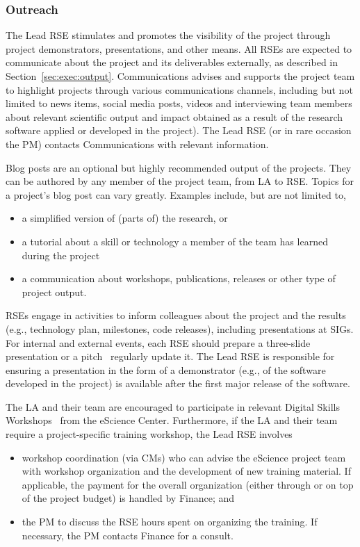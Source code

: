 \subsubsection{Outreach}
\label{sec:exec:outreach}
The Lead RSE stimulates and promotes the visibility of the project through project demonstrators, presentations, and
other means. All RSEs are expected to communicate about the project and its deliverables externally, as
described in Section~\ref{sec:exec:output}. Communications advises and supports the project team to
highlight projects through various communications channels, including but not limited to news items, social media
posts, videos and interviewing team members about relevant scientific output and impact obtained as a result of the
research software applied or developed in the project). The Lead RSE (or in rare occasion the PM) contacts
Communications with relevant information. 

Blog posts are an optional but highly recommended output of the projects. They can be authored by any member of the
project team, from LA to RSE. Topics for a project's blog post can vary greatly. Examples
include, but are not limited to,
\begin{itemize}
\item a simplified version of (parts of) the research, or 
\item a tutorial about a skill or technology a member of the team has learned during the project
\item a communication about workshops, publications, releases or other type of project output.
\end{itemize}

RSEs engage in activities to inform colleagues about the project and the results (e.g., technology plan, milestones,
code releases), including presentations at SIGs. For internal and external events, each RSE should prepare a
three-slide presentation or a pitch~\cite{three:slides} 
regularly update it. The Lead RSE is responsible for ensuring a presentation in the form of a demonstrator (e.g., of the
software developed in the project) is available after the first major release of the software.


The LA and their team are encouraged to participate in relevant Digital Skills Workshops~\cite{digital-skills} from the eScience Center. Furthermore, if the LA and their team
require a project-specific training workshop, the Lead RSE involves
\begin{itemize}
\item workshop coordination (via CMs) who can advise the eScience project team with workshop organization and the development
of new training material. If applicable, the payment for the overall organization (either through or on top of the
project budget) is handled by Finance; and
\item the PM to discuss the RSE hours spent on organizing the training. If necessary, the PM contacts Finance for a consult.
\end{itemize}


